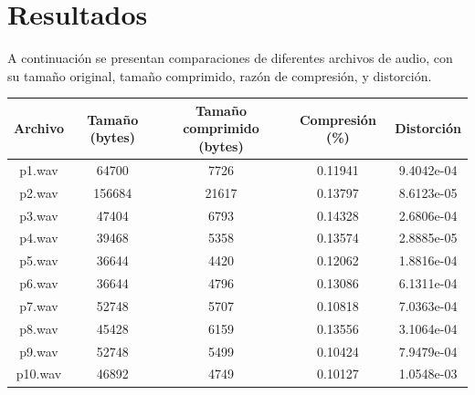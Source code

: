 \documentclass[a4paper,11pt]{article}
\begin{document}
\section{Resultados}
A continuación se presentan comparaciones de diferentes archivos de audio, con
su tamaño original, tamaño comprimido, razón de compresión, y distorción.
\begin{center}
    \begin{tabular}{c | c | c | c | c}
        \hline
        Archivo & Tamaño (bytes) & Tamaño comprimido (bytes) & Compresión (\%) &  Distorción \\ \hline
        p1.wav & 64700 & 7726 & 0.11941 & 9.4042e-04 \\
        p2.wav & 156684 & 21617 & 0.13797 & 8.6123e-05 \\
        p3.wav & 47404 & 6793 & 0.14328 & 2.6806e-04 \\
        p4.wav & 39468 & 5358 & 0.13574 & 2.8885e-05 \\
        p5.wav & 36644 & 4420 & 0.12062 & 1.8816e-04 \\
        p6.wav & 36644 & 4796 & 0.13086 & 6.1311e-04 \\
        p7.wav & 52748 & 5707 & 0.10818 & 7.0363e-04 \\
        p8.wav & 45428 & 6159 & 0.13556 & 3.1064e-04 \\
        p9.wav & 52748 & 5499 & 0.10424 & 7.9479e-04 \\
        p10.wav & 46892 & 4749 & 0.10127 & 1.0548e-03 \\
        \hline
    \end{tabular}
\end{center}
\end{document}

